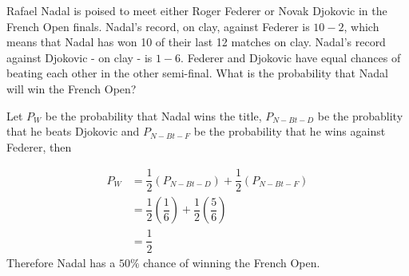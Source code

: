 
%
%
%
%
% 
% 

\question[3] Rafael Nadal is poised to meet either Roger Federer or Novak 
Djokovic in the French Open finals. Nadal's record, on clay, against Federer is 
$10-2$, which means that Nadal has won 10 of their last 12 matches on clay. Nadal's 
record against Djokovic - on clay - is $1-6$. Federer and Djokovic have equal chances of
beating each other in the other semi-final. What is the probability that Nadal will win 
the French Open? 


\ifprintanswers
\fi 

\begin{solution}[\halfpage]
  Let $P_{W}$ be the probability that Nadal wins the title, 
$P_{N-Bt-D}$ be the probablity that he beats Djokovic and $P_{N-Bt-F}$  
be the probability that he wins against Federer, then 
   
  \begin{align}
    P_{W} &= \dfrac{1}{2}(P_{N-Bt-D}) + \dfrac{1}{2}(P_{N-Bt-F}) \\
   	  &= \dfrac{1}{2}(\dfrac{1}{6}) + \dfrac{1}{2}(\dfrac{5}{6}) \\ 
   	  &= \dfrac{1}{2}
  \end{align}
  Therefore Nadal has a $50\%$ chance of winning the French Open.     
\end{solution}
